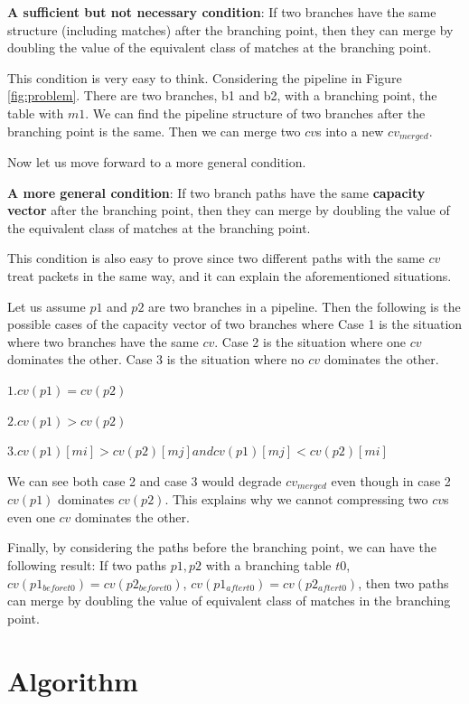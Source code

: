 \documentclass{article}
\begin{document}
\textbf{A sufficient but not necessary condition}: If two branches have the same structure (including matches) after the branching point, then they can merge by doubling the value of the equivalent class of matches at the branching point.

This condition is very easy to think. Considering the pipeline in Figure \ref{fig:problem}. There are two branches, b1 and b2, with a branching point, the table with $m1$. We can find the pipeline structure of two branches after the branching point is the same. Then we can merge two $cv$s into a new $cv_{merged}$.

Now let us move forward to a more general condition.

\textbf{A more general condition}: If two branch paths have the same \textbf{capacity vector} after the branching point, then they can merge by doubling the value of the equivalent class of matches at the branching point.

This condition is also easy to prove since two different paths with the same $cv$ treat packets in the same way, and it can explain the aforementioned situations.

Let us assume $p1$ and $p2$ are two branches in a pipeline. Then the following is the possible cases of the capacity vector of two branches where Case 1 is the situation where two branches have the same $cv$. Case 2 is the situation where one $cv$ dominates the other. Case 3 is the situation where no $cv$ dominates the other. 

$1. cv(p1) = cv(p2)$

$2. cv(p1) > cv(p2)$

$3. cv(p1)[mi] > cv(p2)[mj] and cv(p1)[mj] < cv(p2)[mi]$

We can see both case 2 and case 3 would degrade $cv_{merged}$ even though in case 2 $cv(p1)$ dominates $cv(p2)$. This explains why we cannot compressing two $cv$s even one $cv$ dominates the other.

Finally, by considering the paths before the branching point, we can have the following result: If two paths $p1, p2$ with a branching table $t0$, $cv(p1_{beforet0}) =  cv(p2_{beforet0})$, $cv(p1_{aftert0}) =  cv(p2_{aftert0})$, then two paths can merge by doubling the value of equivalent class of matches in the branching point.

\section{Algorithm}
\end{document}
